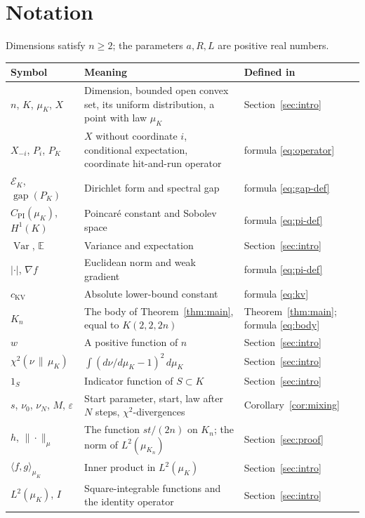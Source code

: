 \documentclass[11pt]{amsart}
\theoremstyle{remark}
\numberwithin{equation}{section}
\newcommand{\E}{\mathbb E}
\newcommand{\Var}{\operatorname{Var}}
\newcommand{\gap}{\operatorname{gap}}
\newcommand{\CPI}{C_{\mathrm{PI}}}
\begin{document}
\section*{Notation}
Dimensions satisfy $n\ge2$;
the parameters $a,R,L$ are positive real numbers.
\footnotesize
\begin{longtable}{@{}>{\raggedright\arraybackslash}p{}>{\raggedright\arraybackslash}p{}>{\raggedright\arraybackslash}p{}@{}}
\toprule
Symbol & Meaning & Defined in\\
\midrule
\endhead
$n$, $K$, $\mu_K$, $X$ & Dimension, bounded open convex set, its uniform distribution, a point with law $\mu_K$ & Section~\ref{sec:intro}\\
$X_{-i}$, $P_i$, $P_K$ & $X$ without coordinate $i$, conditional expectation, coordinate hit-and-run operator & formula \eqref{eq:operator}\\
$\mathcal E_K$, $\gap(P_K)$ & Dirichlet form and spectral gap & formula \eqref{eq:gap-def}\\
$\CPI(\mu_K)$, $H^1(K)$ & Poincar\'e constant and Sobolev space & formula \eqref{eq:pi-def}\\
$\Var$, $\E$ & Variance and expectation & Section~\ref{sec:intro}\\
$|\cdot|$, $\nabla f$ & Euclidean norm and weak gradient & formula \eqref{eq:pi-def}\\
$c_{\mathrm{KV}}$ & Absolute lower-bound constant & formula \eqref{eq:kv}\\
$K_n$ & The body of Theorem~\ref{thm:main}, equal to $K(2,2,2n)$ & Theorem~\ref{thm:main}; formula \eqref{eq:body}\\
$w$ & A positive function of $n$ & Section~\ref{sec:intro}\\
$\chi^2(\nu\,\|\,\mu_K)$ & $\int(d\nu/d\mu_K-1)^2\,d\mu_K$ & Section~\ref{sec:intro}\\
$1_S$ & Indicator function of $S\subset K$ & Section~\ref{sec:intro}\\
$s$, $\nu_0$, $\nu_N$, $M$, $\varepsilon$ & Start parameter, start, law after $N$ steps, $\chi^2$-divergences & Corollary~\ref{cor:mixing}\\
$h$, $\|\cdot\|_\mu$ & The function $st/(2n)$ on $K_n$; the norm of $L^2(\mu_{K_n})$ & Section~\ref{sec:proof}\\
$\langle f,g\rangle_{\mu_K}$ & Inner product in $L^2(\mu_K)$ & Section~\ref{sec:intro}\\
$L^2(\mu_K)$, $I$ & Square-integrable functions and the identity operator & Section~\ref{sec:intro}\\

\end{longtable}
\end{document}
